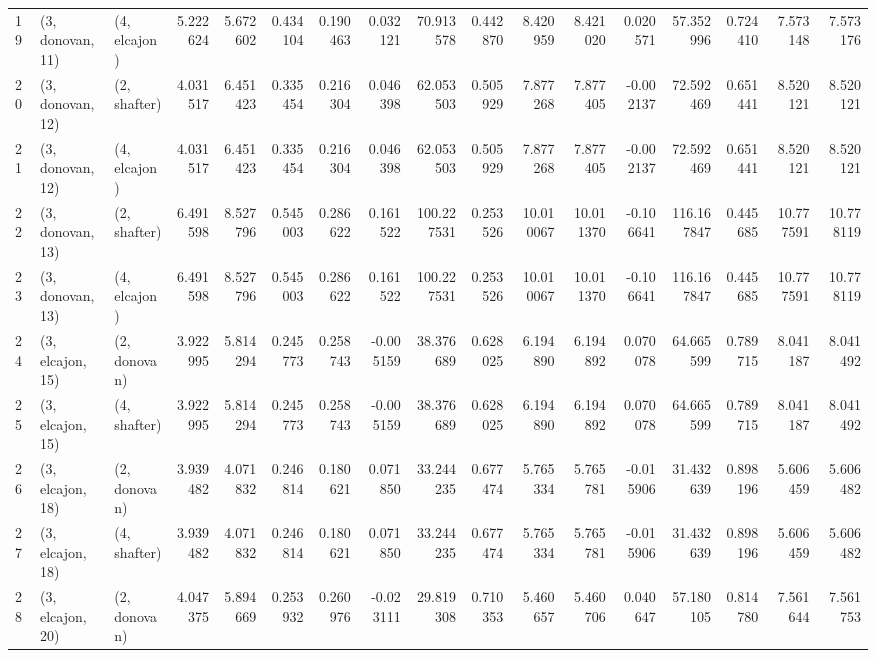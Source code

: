 \begin{tabular}{lllrrrrrrrrrrrrrr}
19 &  (3, donovan, 11) &     (4, elcajon) &  5.222624 &  5.672602 &   0.434104 &  0.190463 &  0.032121 &   70.913578 &  0.442870 &   8.420959 &   8.421020 &  0.020571 &   57.352996 &  0.724410 &   7.573148 &   7.573176 \\
20 &  (3, donovan, 12) &     (2, shafter) &  4.031517 &  6.451423 &   0.335454 &  0.216304 &  0.046398 &   62.053503 &  0.505929 &   7.877268 &   7.877405 & -0.002137 &   72.592469 &  0.651441 &   8.520121 &   8.520121 \\
21 &  (3, donovan, 12) &     (4, elcajon) &  4.031517 &  6.451423 &   0.335454 &  0.216304 &  0.046398 &   62.053503 &  0.505929 &   7.877268 &   7.877405 & -0.002137 &   72.592469 &  0.651441 &   8.520121 &   8.520121 \\
22 &  (3, donovan, 13) &     (2, shafter) &  6.491598 &  8.527796 &   0.545003 &  0.286622 &  0.161522 &  100.227531 &  0.253526 &  10.010067 &  10.011370 & -0.106641 &  116.167847 &  0.445685 &  10.777591 &  10.778119 \\
23 &  (3, donovan, 13) &     (4, elcajon) &  6.491598 &  8.527796 &   0.545003 &  0.286622 &  0.161522 &  100.227531 &  0.253526 &  10.010067 &  10.011370 & -0.106641 &  116.167847 &  0.445685 &  10.777591 &  10.778119 \\
24 &  (3, elcajon, 15) &     (2, donovan) &  3.922995 &  5.814294 &   0.245773 &  0.258743 & -0.005159 &   38.376689 &  0.628025 &   6.194890 &   6.194892 &  0.070078 &   64.665599 &  0.789715 &   8.041187 &   8.041492 \\
25 &  (3, elcajon, 15) &     (4, shafter) &  3.922995 &  5.814294 &   0.245773 &  0.258743 & -0.005159 &   38.376689 &  0.628025 &   6.194890 &   6.194892 &  0.070078 &   64.665599 &  0.789715 &   8.041187 &   8.041492 \\
26 &  (3, elcajon, 18) &     (2, donovan) &  3.939482 &  4.071832 &   0.246814 &  0.180621 &  0.071850 &   33.244235 &  0.677474 &   5.765334 &   5.765781 & -0.015906 &   31.432639 &  0.898196 &   5.606459 &   5.606482 \\
27 &  (3, elcajon, 18) &     (4, shafter) &  3.939482 &  4.071832 &   0.246814 &  0.180621 &  0.071850 &   33.244235 &  0.677474 &   5.765334 &   5.765781 & -0.015906 &   31.432639 &  0.898196 &   5.606459 &   5.606482 \\
28 &  (3, elcajon, 20) &     (2, donovan) &  4.047375 &  5.894669 &   0.253932 &  0.260976 & -0.023111 &   29.819308 &  0.710353 &   5.460657 &   5.460706 &  0.040647 &   57.180105 &  0.814780 &   7.561644 &   7.561753 \\

\end{tabular}
